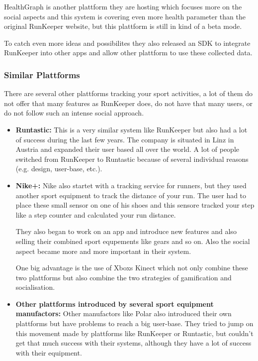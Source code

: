 \documentclass[a4paper,11pt]{article}
\begin{document}
HealthGraph is another plattform they are hosting which focuses more on the social aspects and this system is covering even more health parameter than the original RunKeeper website, but this plattform is still in kind of a beta mode.

To catch even more ideas and possibilites they also released an SDK to integrate RunKeeper into other apps and allow other plattform to use these collected data. \\

\subsubsection{Similar Plattforms}
\label{sect:star:competitors}
There are several other plattforms tracking your sport activities, a lot of them do not offer that many features as RunKeeper does, do not have that many users, or do not follow such an intense social approach.

\begin{itemize}
	\item \textbf{Runtastic:} This is a very similar system like RunKeeper but also had a lot of success during the last few years. The company is situated in Linz in Austria and expanded their user based all over the world. A lot of people switched from RunKeeper to Runtastic because of several individual reasons (e.g. design, user-base, etc.). \\
	\item \textbf{Nike+:} Nike also startet with a tracking service for runners, but they used another sport equipment to track the distance of your run. The user had to place these small sensor on one of his shoes and this sensore tracked your step like a step counter and calculated your run distance.
	
	They also began to work on an app and introduce new features and also selling their combined sport equpements like gears and so on. Also the social aspect became more and more important in their system.
	
	One big advantage is the use of Xboxs Kinect which not only combine these two plattforms but also combine the two strategies of gamification and socialisation. \\
	\item \textbf{Other plattforms introduced by several sport equipment manufactors:} Other manufactors like Polar also introduced their own plattforms but have problems to reach a big user-base. They tried to jump on this movement made by plattforms like RunKeeper or Runtastic, but couldn't get that much success with their systems, although they have a lot of success with their equipment.
\end{itemize}
\end{document}
